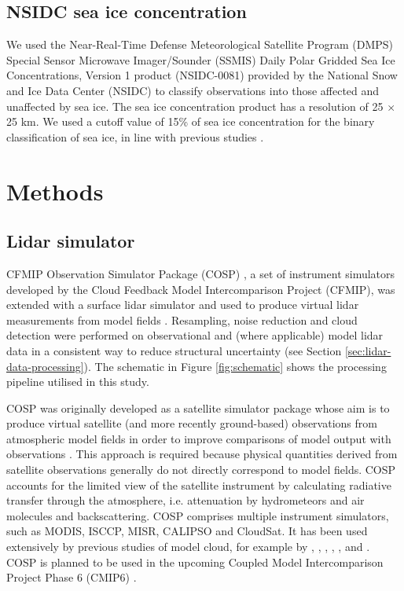 \subsection{NSIDC sea ice concentration}

We used the Near-Real-Time Defense Meteorological Satellite Program (DMPS)
Special Sensor Microwave Imager/Sounder (SSMIS) Daily Polar Gridded Sea Ice
Concentrations, Version 1 product (NSIDC-0081) \citep{maslanik1999} provided by
the National Snow and Ice Data Center (NSIDC) to classify observations into
those affected and unaffected by sea ice. The sea ice concentration product has
a resolution of 25 $\times$ 25 \unit{km}. We used a cutoff value of 15\% of sea
ice concentration for the binary classification of sea ice, in line with
previous studies \citep{comiso2008}.

\section{Methods}

\subsection{Lidar simulator}

CFMIP Observation Simulator Package (COSP) \citep{bodas-salcedo2011}, a set of
instrument simulators developed by the Cloud Feedback Model Intercomparison
Project (CFMIP), was extended with a surface lidar simulator and used to produce
virtual lidar measurements from model fields \citep{kuma2019}. Resampling, noise
reduction and cloud detection were performed on observational and (where
applicable) model lidar data in a consistent way to reduce structural
uncertainty (see Section \ref{sec:lidar-data-processing}). The schematic in
Figure \ref{fig:schematic} shows the processing pipeline utilised in this study.

COSP was originally developed as a satellite simulator package whose aim is to
produce virtual satellite (and more recently ground-based) observations from
atmospheric model fields in order to improve comparisons of model output with
observations \citep{bodas-salcedo2011}. This approach is required because
physical quantities derived from satellite observations generally do not
directly correspond to model fields. COSP accounts for the limited view of the
satellite instrument by calculating radiative transfer through the atmosphere,
i.e. attenuation by hydrometeors and air molecules and backscattering. COSP
comprises multiple instrument simulators, such as MODIS, ISCCP, MISR, CALIPSO
and CloudSat. It has been used extensively by previous studies of model cloud,
for example by \cite{kay2012}, \cite{franklin2013}, \cite{klein2013},
\cite{williams2017}, \cite{jin2017} , and \cite{schuddeboom2018a}. COSP is
planned to be used in the upcoming Coupled Model Intercomparison Project Phase 6
(CMIP6) \citep{webb2017}.

